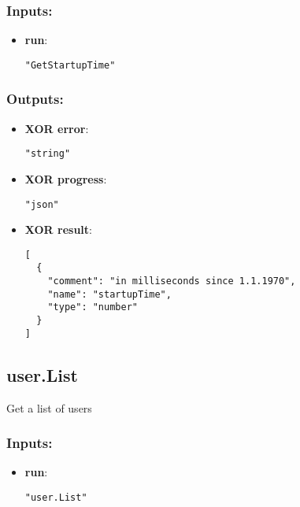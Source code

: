 \subsubsection*{Inputs:}
\begin{itemize}
    \item \textbf{run}: 
\begin{lstlisting}
"GetStartupTime"
\end{lstlisting}
  \end{itemize}

\subsubsection*{Outputs:}
\begin{itemize}
    \item \textbf{XOR error}: 
\begin{lstlisting}
"string"
\end{lstlisting}
    \item \textbf{XOR progress}: 
\begin{lstlisting}
"json"
\end{lstlisting}
    \item \textbf{XOR result}: 
\begin{lstlisting}
[
  {
    "comment": "in milliseconds since 1.1.1970", 
    "name": "startupTime", 
    "type": "number"
  }
]
\end{lstlisting}
  \end{itemize}

\subsection{user.List}
Get a list of users
\subsubsection*{Inputs:}
\begin{itemize}
    \item \textbf{run}: 
\begin{lstlisting}
"user.List"
\end{lstlisting}
  \end{itemize}

